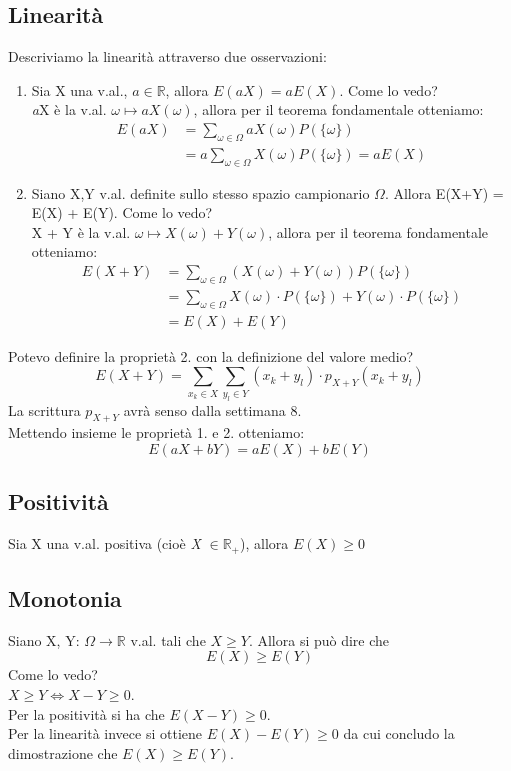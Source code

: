 \documentclass{report}
\begin{document}
\subsection{Linearità}
Descriviamo la linearità attraverso due osservazioni: \begin{enumerate}
    \item Sia X una v.al., \(a \in \mathbb{R}\), allora \(E(aX) = aE(X)\). Come lo vedo?\\
    \textit{a}X è la v.al. \(\omega \mapsto aX(\omega)\), allora per il teorema fondamentale otteniamo:
    \begin{align}
        E(aX) & = \sum_{\omega \in \Omega}aX(\omega)P(\{\omega\})\\
        & = a \sum_{\omega \in \Omega} X(\omega) P(\{\omega\}) = aE(X)
    \end{align}
    \item Siano X,Y v.al. definite sullo stesso spazio campionario \(\Omega\). Allora E(X+Y) = E(X) + E(Y). Come lo vedo?\\
    X + Y è la v.al. \(\omega \mapsto X(\omega) + Y(\omega)\), allora per il teorema fondamentale otteniamo:
    \begin{align}
        E(X + Y) & = \sum_{\omega \in \Omega} (X(\omega) + Y(\omega))P(\{\omega\})\\
        & = \sum_{\omega \in \Omega} X(\omega)\cdot P(\{\omega\}) + Y(\omega)\cdot P(\{\omega\})\\
        & = E(X) + E(Y)
    \end{align}
\end{enumerate}
Potevo definire la proprietà 2. con la definizione del valore medio? 
\[E(X+Y) = \sum_{x_k \in \textit{X}} \sum_{y_l \in \textit{Y}} (x_k + y_l) \cdot p_{X+Y}(x_k +y_l)\]
La scrittura \(p_{X+Y}\) avrà senso dalla settimana 8.\\
Mettendo insieme le proprietà 1. e 2. otteniamo: \[E(aX+bY) = aE(X) + bE(Y)\]
\subsection{Positività}
Sia X una v.al. positiva (cioè \textit{X} \(\in \mathbb{R_{+}}\)), allora \(E(X) \geq 0\)
\subsection{Monotonia}
Siano X, Y: \(\Omega \xrightarrow{} \mathbb{R}\) v.al. tali che \(X \geq Y\). Allora si può dire che \[E(X) \geq E(Y)\]
Come lo vedo?\\
\(X \geq Y \Longleftrightarrow X - Y \geq 0\).\\ 
Per la positività si ha che \(E(X-Y) \geq 0\).\\ 
Per la linearità invece si ottiene \(E(X) - E(Y) \geq 0\) da cui concludo la dimostrazione che \(E(X) \geq E(Y)\).
\end{document}

